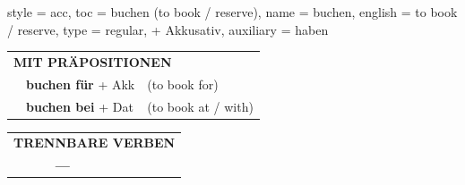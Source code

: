 \begin{verbentry}{
  style = {acc},
  toc = {buchen (to book / reserve)},
  name = {buchen},
  english = {to book / reserve},
  type = {regular, + Akkusativ},
  auxiliary = {haben}
}
\vspace{10pt}

\begin{tabular}{lll}
\multicolumn{3}{l}{\textbf{MIT PRÄPOSITIONEN}}\\
& \textbf{buchen für} + Akk & (to book for)\\
& \textbf{buchen bei} + Dat & (to book at / with)\\
\end{tabular}
\hfill
\begin{tabular}{lll}
\multicolumn{3}{l}{\textbf{TRENNBARE VERBEN}}\\
& \textbf{---} & \\
\end{tabular}
\vspace{-5pt}
\end{verbentry}
